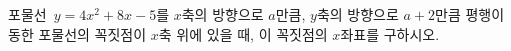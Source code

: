포물선~$y=4x^2+8x-5$를 $x$축의 방향으로 $a$만큼, $y$축의 방향으로 $a+2$만큼 평행이동한 포물선의 꼭짓점이 $x$축 위에 있을 때, 이 꼭짓점의 $x$좌표를 구하시오.
